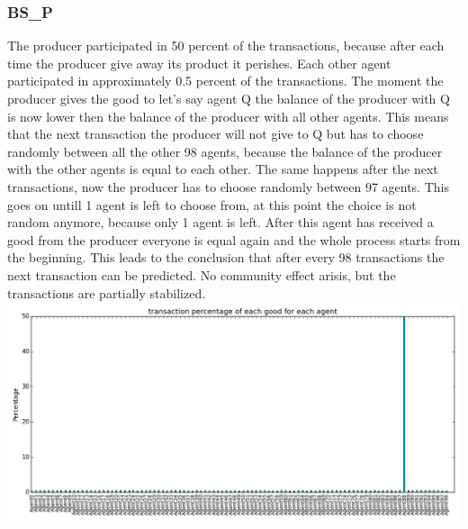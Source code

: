 \documentclass[twoside,openright]{uva-bachelor-thesis}
\begin{document}
\subsubsection{BS\_P}
The producer participated in 50 percent of the transactions, because after each time the producer give away its product it perishes. Each other agent participated in approximately 0.5 percent of the transactions. The moment the producer gives the good to let's say agent Q the balance of the producer with Q is now lower then the balance of the producer with all other agents. This means that the next transaction the producer will not give to Q but has to choose randomly between all the other 98 agents, because the balance of the producer with the other agents is equal to each other. The same happens after the next transactions, now the producer has to choose randomly between 97 agents. This goes on untill 1 agent is left to choose from, at this point the choice is not random anymore, because only 1 agent is left. After this agent has received a good from the producer everyone is equal again and the whole process starts from the beginning. This leads to the conclusion that after every 98 transactions the next transaction can be predicted.  No community effect arisis, but the transactions are partially stabilized. \\
\includegraphics[scale=0.4]{experiment_images/BR_BS_P}
\end{document}
